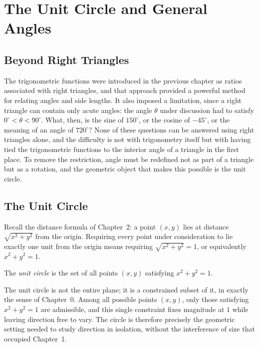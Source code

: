\chapter{The Unit Circle and General Angles}
\label{ch:ch04-unit-circle}

\section{Beyond Right Triangles}

The trigonometric functions were introduced in the previous chapter as
ratios associated with right triangles, and that approach provided a
powerful method for relating angles and side lengths. It also imposed a
limitation, since a right triangle can contain only acute angles: the angle
$\theta$ under discussion had to satisfy $0^\circ < \theta < 90^\circ$. What,
then, is the sine of $150^\circ$, or the cosine of $-45^\circ$, or the
meaning of an angle of $720^\circ$? None of these questions can be answered
using right triangles alone, and the difficulty is not with trigonometry
itself but with having tied the trigonometric functions to the interior
angle of a triangle in the first place. To remove the restriction, angle
must be redefined not as part of a triangle but as a rotation, and the
geometric object that makes this possible is the unit circle.

\section{The Unit Circle}

Recall the distance formula of Chapter~2: a point $(x,y)$ lies at distance
$\sqrt{x^2+y^2}$ from the origin. Requiring every point under consideration
to lie exactly one unit from the origin means requiring $\sqrt{x^2+y^2}=1$,
or equivalently $x^2+y^2=1$.

\begin{definition}
The \emph{unit circle} is the set of all points $(x,y)$ satisfying
$x^2+y^2=1$.
\end{definition}

The unit circle is not the entire plane; it is a constrained subset of it,
in exactly the sense of Chapter~0. Among all possible points $(x,y)$, only
those satisfying $x^2+y^2=1$ are admissible, and this single constraint
fixes magnitude at $1$ while leaving direction free to vary. The circle is
therefore precisely the geometric setting needed to study direction in
isolation, without the interference of size that occupied Chapter~1.

